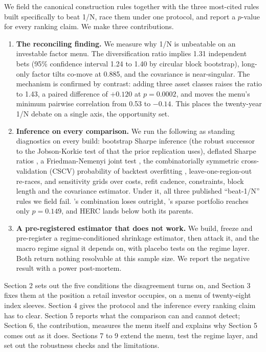 \documentclass[12pt,letterpaper]{article}
\begin{document}
We field the canonical construction rules together with the three most-cited rules built
specifically to beat 1/N, race them under one protocol, and report a $p$-value for every
ranking claim. We make three contributions.

\begin{enumerate}\setlength{\itemsep}{6pt}
\item \textbf{The reconciling finding.} We measure why
1/N is unbeatable on an investable factor menu. The diversification ratio implies
1.31 independent bets (95\% confidence interval 1.24 to 1.40 by circular block
bootstrap), long-only factor tilts co-move at 0.885, and the covariance is
near-singular. The mechanism is confirmed by contrast: adding three asset classes
raises the ratio to 1.43, a paired difference of $+0.120$ at $p = 0.0002$, and
moves the menu's minimum pairwise correlation from 0.53 to $-0.14$. This places
the twenty-year 1/N debate on a single axis, the opportunity set.

\item \textbf{Inference on every comparison.} We run the following as
standing diagnostics on every build: \citet{ledoit2008} bootstrap Sharpe
inference (the robust successor to the Jobson-Korkie test of \citeyear{jobson1981} that the prior replication uses), deflated Sharpe ratios \citep{bailey2014}, a Friedman-Nemenyi joint test
\citep{demsar2006}, the combinatorially symmetric cross-validation (CSCV) probability of backtest overfitting \citep{bailey2017}, leave-one-region-out re-races, and sensitivity grids over costs, refit cadence,
constraints, block length and the covariance estimator. Under it, all three
published ``beat-1/N'' rules we field fail. \citeauthor{yuan2023}'s
\citeyearpar{yuan2023} combination loses outright, \citeauthor{brodie2009}'s
\citeyearpar{brodie2009} sparse portfolio reaches only $p = 0.149$, and HERC
lands below both its parents.

\item \textbf{A pre-registered estimator that does not work.} We build, freeze and
pre-register a regime-conditioned shrinkage estimator, then attack it, and the
macro regime signal it depends on, with placebo tests on the regime layer. Both return nothing resolvable at this sample size. We report the
negative result with a power post-mortem.
\end{enumerate}

Section 2 sets out the five conditions the disagreement turns on, and Section 3 fixes them at
the position a retail investor occupies, on a menu of twenty-eight index sleeves. Section 4
gives the protocol and the inference every ranking claim has to clear. Section 5 reports what
the comparison can and cannot detect; Section 6, the contribution, measures the menu itself and
explains why Section 5 comes out as it does. Sections 7 to 9 extend the menu, test the regime
layer, and set out the robustness checks and the limitations.
\end{document}
